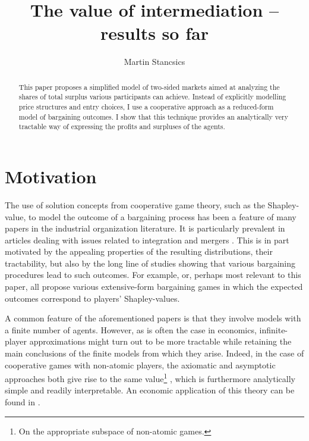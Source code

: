 \documentclass[a4paper]{article}
\title{The value of intermediation -- results so far}
\author{Martin Stancsics}
\begin{document}
\maketitle

\begin{abstract}
    This paper proposes a simplified model of two-sided markets aimed at analyzing the shares of total surplus various participants can achieve. Instead of explicitly modelling price structures and entry choices, I use a cooperative approach as a reduced-form model of bargaining outcomes. I show that this technique provides an analytically very tractable way of expressing the profits and surpluses of the agents.
\end{abstract}


\section{Motivation}

The use of solution concepts from cooperative game theory, such as the Shapley-value, to model the outcome of a bargaining process has been a feature of many papers in the industrial organization literature. It is particularly prevalent in articles dealing with issues related to integration and mergers \parencite[e.g.][]{hart1990property,segal2003collusion,inderst2003bargaining,montez2007downstream}. This is in part motivated by the appealing properties of the resulting distributions, their tractability, but also by the long line of studies showing that various bargaining procedures lead to such outcomes. For example, \textcite{gul1989bargaining,winter1994demand,hart1996bargaining,inderst2003bargaining,} or, perhaps most relevant to this paper, \textcite{stole1996intra} all propose various extensive-form bargaining games in which the expected outcomes correspond to players' Shapley-values.

A common feature of the aforementioned papers is that they involve models with a finite number of agents. However, as is often the case in economics, infinite-player approximations might turn out to be more tractable while retaining the main conclusions of the finite models from which they arise. Indeed, in the case of cooperative games with non-atomic players, the axiomatic and asymptotic approaches both give rise to the same value\footnote{On the appropriate subspace of non-atomic games.} \parencite{aumann2015values}, which is furthermore analytically simple and readily interpretable. An economic application of this theory can be found in \textcite{billera1978internal}.
\end{document}

